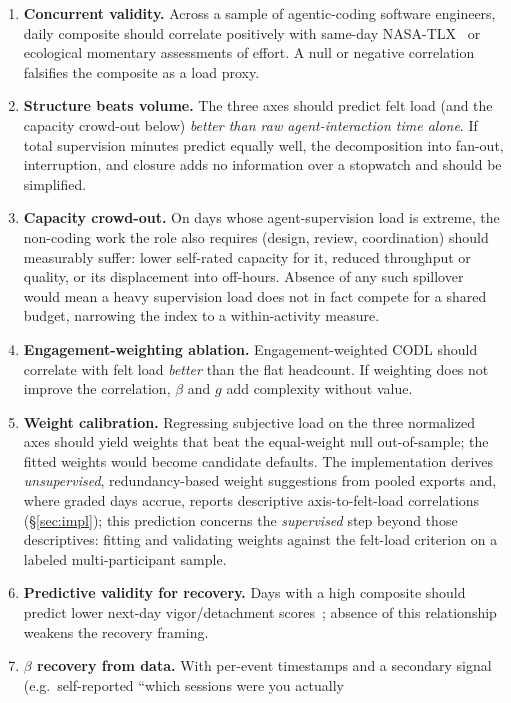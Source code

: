 \documentclass[10pt,twocolumn]{article}
\begin{document}
\begin{enumerate}
  \item \textbf{Concurrent validity.} Across a sample of agentic-coding
  software engineers, daily composite should correlate positively with same-day
  NASA-TLX~\cite{hart1988} or ecological momentary assessments of effort. A null
  or negative correlation falsifies the composite as a load proxy.
  \item \textbf{Structure beats volume.} The three axes should predict felt
  load (and the capacity crowd-out below) \emph{better than raw
  agent-interaction time alone}. If total supervision minutes predict equally
  well, the decomposition into fan-out, interruption, and closure adds no
  information over a stopwatch and should be simplified.
  \item \textbf{Capacity crowd-out.} On days whose agent-supervision load is
  extreme, the non-coding work the role also requires (design, review,
  coordination) should measurably suffer: lower self-rated capacity for it,
  reduced throughput or quality, or its displacement into off-hours. Absence of
  any such spillover would mean a heavy supervision load does not in fact compete
  for a shared budget, narrowing the index to a within-activity measure.
  \item \textbf{Engagement-weighting ablation.} Engagement-weighted CODL should
  correlate with felt load \emph{better} than the flat headcount. If weighting
  does not improve the correlation, $\beta$ and $g$ add complexity without value.
  \item \textbf{Weight calibration.} Regressing subjective load on the three
  normalized axes should yield weights that beat the equal-weight null
  out-of-sample; the fitted weights would become candidate defaults. The
  implementation derives \emph{unsupervised}, redundancy-based weight
  suggestions from pooled exports and, where graded days accrue, reports
  descriptive axis-to-felt-load correlations (\S\ref{sec:impl}); this prediction
  concerns the \emph{supervised} step beyond those descriptives: fitting and
  validating weights against the felt-load criterion on a labeled
  multi-participant sample.
  \item \textbf{Predictive validity for recovery.} Days with a high composite
  should predict lower next-day vigor/detachment
  scores~\cite{sonnentag2010}; absence of this relationship weakens the recovery
  framing.
  \item \textbf{$\beta$ recovery from data.} With per-event timestamps and a
  secondary signal (e.g.\ self-reported ``which sessions were you actually

\end{enumerate}
\end{document}
